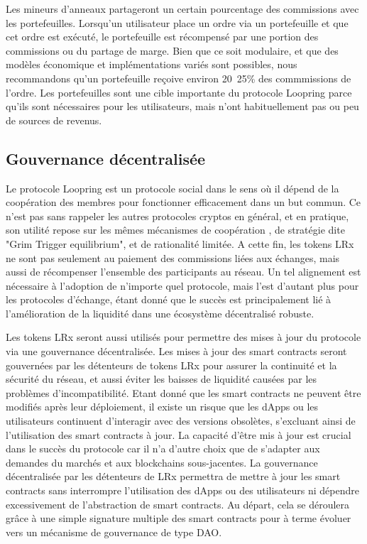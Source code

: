 \documentclass[UTF8,nofonts]{article}
\begin{document}
\begin{multicols}{2}
Les mineurs d'anneaux partageront un certain pourcentage des commissions avec les portefeuilles. Lorsqu'un utilisateur place un ordre via un portefeuille et que cet ordre est exécuté, le portefeuille est récompensé par une portion des commissions ou du partage de marge. Bien que ce soit modulaire, et que des modèles économique et implémentations variés sont possibles, nous recommandons qu'un portefeuille reçoive environ 20~25\% des commmissions de l'ordre. Les portefeuilles sont une cible importante du protocole Loopring parce qu'ils sont nécessaires pour les utilisateurs, mais n'ont habituellement pas ou peu de sources de revenus.

\subsection{Gouvernance décentralisée}
Le protocole Loopring est un protocole social dans le sens où il dépend de la coopération des membres pour fonctionner efficacement dans un but commun. Ce n'est pas sans rappeler les autres protocoles cryptos en général, et en pratique, son utilité repose sur les mêmes mécanismes de coopération \cite{vitalikgovernance}, de stratégie dite "Grim Trigger equilibrium", et de rationalité limitée. A cette fin, les tokens LRx ne sont pas seulement au paiement des commissions liées aux échanges, mais aussi de récompenser l'ensemble des participants au réseau. Un tel alignement est nécessaire à l'adoption de n'importe quel protocole, mais l'est d'autant plus pour les protocoles d'échange, étant donné que le succès est principalement lié à l'amélioration de la liquidité dans une écosystème décentralisé robuste.

Les tokens LRx seront aussi utilisés pour permettre des mises à jour du protocole via une gouvernance décentralisée. Les mises à jour des smart contracts seront gouvernées par les détenteurs de tokens LRx pour assurer la continuité et la sécurité du réseau, et aussi éviter les baisses de liquidité causées par les problèmes d'incompatibilité. Etant donné que les smart contracts ne peuvent être modifiés après leur déploiement, il existe un risque que les dApps ou les utilisateurs continuent d'interagir avec des versions obsolètes, s'excluant ainsi de l'utilisation des smart contracts à jour. La capacité d'être mis à jour est crucial dans le succès du protocole car il n'a d'autre choix que de s'adapter aux demandes du marchés et aux blockchains sous-jacentes. La gouvernance décentralisée par les détenteurs de LRx permettra de mettre à jour les smart contracts sans interrompre l'utilisation des dApps ou des utilisateurs ni dépendre excessivement de l'abstraction de smart contracts. Au départ, cela se déroulera grâce à une simple signature multiple des smart contracts pour à terme évoluer vers un mécanisme de gouvernance de type DAO.


\end{multicols}
\end{document}
